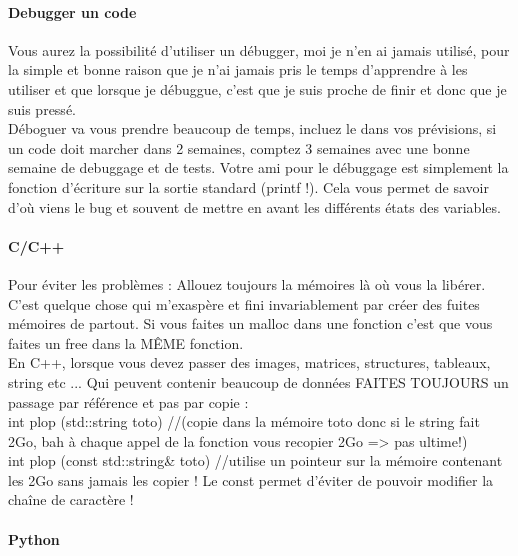 \documentclass[a4paper,10pt]{book_ad}
\begin{document}
\paragraph{Debugger un code}

Vous aurez la possibilité d'utiliser un débugger, moi je n'en ai jamais utilisé, pour la simple et
 bonne raison que je n'ai jamais pris le temps d'apprendre à les utiliser et que lorsque je débuggue,
 c'est que je suis proche de finir et donc que je suis pressé.\\
Déboguer va vous prendre beaucoup de temps, incluez le dans vos prévisions, si un code doit marcher 
dans 2 semaines, comptez 3 semaines avec une bonne semaine de debuggage et de tests. Votre ami pour
 le débuggage est simplement la fonction d'écriture sur la sortie standard (printf !). Cela vous 
permet de savoir d'où  viens le bug et souvent de mettre en avant les différents états des variables.\\


\paragraph{C/C++}

Pour éviter les problèmes : Allouez toujours la mémoires là où vous la libérer. C'est quelque chose
 qui m'exaspère et fini invariablement par créer des fuites mémoires de partout. Si vous faites 
un malloc dans une fonction c'est que vous faites un free dans la MÊME fonction. \\

En C++, lorsque vous devez passer des images, matrices, structures, tableaux, string  etc ... Qui 
peuvent contenir beaucoup de données FAITES TOUJOURS un passage par référence et pas par copie :\\

int plop (std::string toto) //(copie dans la mémoire toto donc si le string fait 2Go, bah à chaque
 appel de la fonction vous recopier 2Go => pas ultime!)\\

int plop (const std::string\& toto) //utilise un pointeur sur la mémoire contenant les 2Go sans
 jamais les copier ! Le const permet d'éviter de pouvoir modifier la chaîne de caractère !\\

\paragraph{Python}
\end{document}
